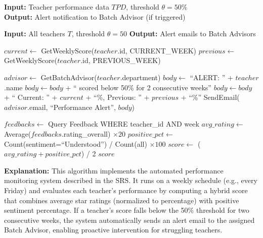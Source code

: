 \textbf{Input:} Teacher performance data $TPD$, threshold $\theta = 50\%$ \\
\textbf{Output:} Alert notification to Batch Advisor (if triggered)

\begin{algorithm}[H]
\caption{Weekly Performance Monitor and Alert}
\begin{algorithmic}[1]

\State \textbf{Input:} All teachers $T$, threshold $\theta = 50$
\State \textbf{Output:} Alert emails to Batch Advisors

        \State $current \gets$ GetWeeklyScore($teacher$.id, CURRENT\_WEEK)
        \State $previous \gets$ GetWeeklyScore($teacher$.id, PREVIOUS\_WEEK)
        
            \State $advisor \gets$ GetBatchAdvisor($teacher$.department)
            \State $body \gets$ ``ALERT: '' + $teacher$.name
            \State $body \gets body$ + `` scored below 50\% for 2 consecutive weeks''
            \State $body \gets body$ + `` Current: '' + $current$ + ``\%, Previous: '' + $previous$ + ``\%''
            \State SendEmail($advisor$.email, ``Performance Alert'', $body$)
        \EndIf
    \EndFor
\EndFunction

    \State $feedbacks \gets$ Query Feedback WHERE teacher\_id AND week
    \State $avg\_rating \gets$ Average($feedbacks$.rating\_overall) $\times 20$
    \State $positive\_pct \gets$ Count(sentiment=``Understood'') / Count(all) $\times 100$
    \State $score \gets$ ($avg\_rating + positive\_pct$) / 2
    \State \Return $score$
\EndFunction

\end{algorithmic}
\end{algorithm}

\textbf{Explanation:}
This algorithm implements the automated performance monitoring system described in the SRS. It runs on a weekly schedule (e.g., every Friday) and evaluates each teacher's performance by computing a hybrid score that combines average star ratings (normalized to percentage) with positive sentiment percentage. If a teacher's score falls below the 50\% threshold for two consecutive weeks, the system automatically sends an alert email to the assigned Batch Advisor, enabling proactive intervention for struggling teachers.


